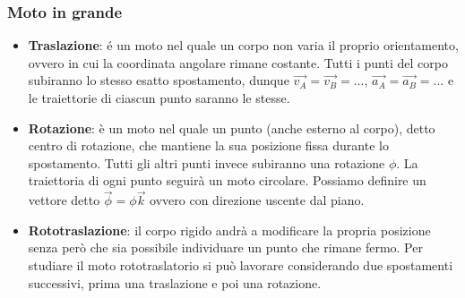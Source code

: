 \subsubsection{Moto in grande}
\begin{itemize}
    \item \textbf{Traslazione}: é un moto nel quale un corpo non varia il proprio orientamento, ovvero in cui la coordinata angolare rimane costante. Tutti i punti del corpo subiranno lo stesso esatto spostamento, dunque $\vec{v_A} = \vec{v_B} = \dots$, $\vec{a_A} = \vec{a_B} = \dots$ e le traiettorie di ciascun punto saranno le stesse.
    \item \textbf{Rotazione}: è un moto nel quale un punto (anche esterno al corpo), detto centro di rotazione, che mantiene la sua posizione fissa durante lo spostamento. Tutti gli altri punti invece subiranno una rotazione $\phi$. La traiettoria di ogni punto seguirà un moto circolare. Possiamo definire un vettore detto $\vec{\phi} = \phi \vec{k}$ ovvero con direzione uscente dal piano.
    \item \textbf{Rototraslazione}: il corpo rigido andrà a modificare la propria posizione senza però che sia possibile individuare un punto che rimane fermo. Per studiare il moto rototraslatorio si può lavorare considerando due spostamenti successivi, prima una traslazione e poi una rotazione.
\end{itemize}
